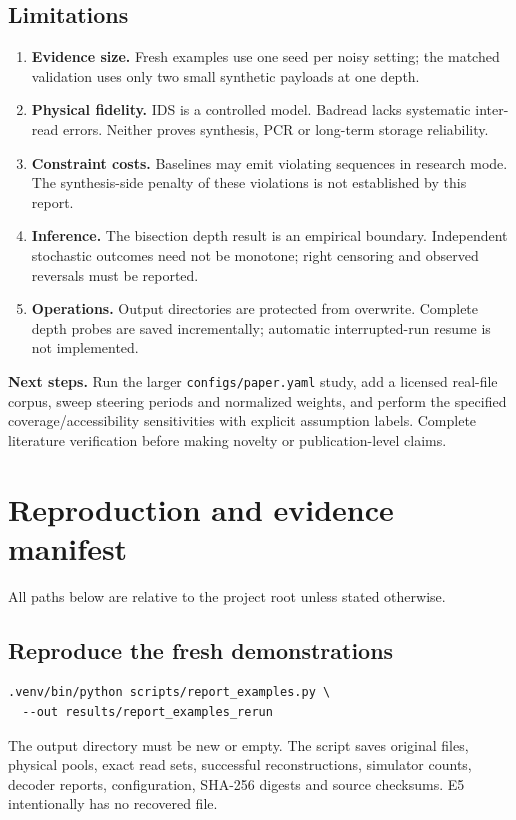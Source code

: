 \documentclass[11pt,a4paper]{article}
\newcommand{\pageheading}[2]{\clearpage\section{#1}{\color{muted}\small #2}\par\vspace{5pt}}
\begin{document}
\subsection*{Limitations}
\begin{enumerate}
\item \textbf{Evidence size.} Fresh examples use one seed per noisy setting; the
  matched validation uses only two small synthetic payloads at one depth.
\item \textbf{Physical fidelity.} IDS is a controlled model. Badread lacks systematic
  inter-read errors. Neither proves synthesis, PCR or long-term storage reliability.
\item \textbf{Constraint costs.} Baselines may emit violating sequences in research
  mode. The synthesis-side penalty of these violations is not established by this report.
\item \textbf{Inference.} The bisection depth result is an empirical boundary. Independent
  stochastic outcomes need not be monotone; right censoring and observed reversals must be reported.
\item \textbf{Operations.} Output directories are protected from overwrite. Complete
  depth probes are saved incrementally; automatic interrupted-run resume is not implemented.
\end{enumerate}
\textbf{Next steps.} Run the larger \texttt{configs/paper.yaml} study, add a licensed
real-file corpus, sweep steering periods and normalized weights, and perform the specified
coverage/accessibility sensitivities with explicit assumption labels. Complete literature
verification before making novelty or publication-level claims.

\pageheading{Reproduction and evidence manifest}{All paths below are relative to the project root unless stated otherwise.}
\subsection*{Reproduce the fresh demonstrations}
\begin{lstlisting}
.venv/bin/python scripts/report_examples.py \
  --out results/report_examples_rerun
\end{lstlisting}
The output directory must be new or empty. The script saves original files, physical
pools, exact read sets, successful reconstructions, simulator counts, decoder reports,
configuration, SHA-256 digests and source checksums. E5 intentionally has no recovered file.
\end{document}
